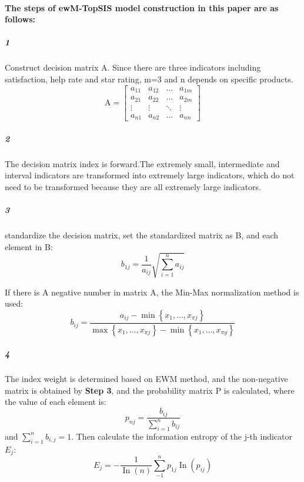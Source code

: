 \documentclass[../mcmpaper]{subfiles}
\begin{document}
    \paragraph{The steps of ewM-TopSIS model construction in this paper are as follows:}
    \subparagraph{1} Construct decision matrix A. Since there are three indicators including satisfaction, help rate and star rating, m=3 and n depends on specific products.
    \begin{equation}
    \mathrm{A}=\left[\begin{array}{cccc}
    a_{11} & a_{12} & \ldots & a_{1 m} \\
    a_{21} & a_{22} & \ldots & a_{2 m} \\
    \vdots & \vdots & \ddots & \vdots \\
    a_{n 1} & a_{n 2} & \ldots & a_{n n}
    \end{array}\right]
    \end{equation}
    \subparagraph{2} The decision matrix index is forward.The extremely small, intermediate and interval indicators are transformed into extremely large indicators, which do not need to be transformed because they are all extremely large indicators.
    \subparagraph{3} standardize the decision matrix, set the standardized matrix as B, and each element in B:
    \begin{equation}
    b_{1 j}=\frac{1}{a_{i j}}\sqrt{\sum_{i=1}^{n} a_{i j}}
    \end{equation}
    \par
    If there is A negative number in matrix A, the Min-Max normalization method is used:
    \begin{equation}
    b_{i j}=\frac{a_{i j}-\min \left\{x_{1}, \ldots, x_{\pi j}\right\}}{\max \left\{x_{1}, \ldots, x_{\pi j}\right\}-\min \left\{x_{1}, \ldots, x_{\pi y}\right\}}
    \end{equation}
    \subparagraph{4}
    The index weight is determined based on EWM method, and the non-negative matrix is obtained by \textbf{Step 3}, and the probability matrix P is calculated, where the value of each element is:
    \begin{equation}
    p_{n j}=\frac{b_{i j}}{\sum_{i=1}^{n} b_{i j}}
    \end{equation}
    and $\sum_{i=1}^{n}b_{i,j}=1$. Then calculate the information entropy of the j-th indicator $E_j$:
    \begin{equation}
    E_{j}=-\frac{1}{\operatorname{In}(n)} \sum_{-1}^{n} p_{1 j} \operatorname{In}\left(p_{i j}\right)
    \end{equation}
\end{document}
